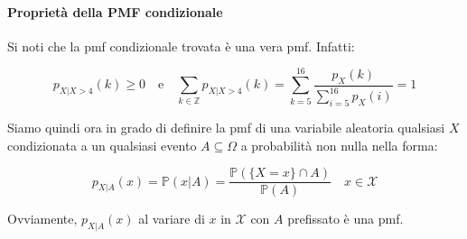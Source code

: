 \paragraph{Proprietà della PMF condizionale}
Si noti che la pmf condizionale trovata è una vera pmf. Infatti:

\[
p_{X|X>4}(k) \ge 0 \quad \text{e} \quad \sum_{k \in \mathbb{Z}} p_{X|X>4}(k) = \sum_{k=5}^{16} \frac{p_X(k)}{\sum_{i=5}^{16} p_X(i)} = 1
\]

Siamo quindi ora in grado di definire la pmf di una variabile aleatoria qualsiasi $X$ condizionata a un qualsiasi evento $A \subseteq \Omega$ a probabilità non nulla nella forma:

\begin{equation}
\boxed{p_{X|A}(x) = \mathbb{P}(x|A) = \frac{\mathbb{P}(\{X = x\} \cap A)}{\mathbb{P}(A)} \quad x \in \mathcal{X}}
\end{equation}

Ovviamente, $p_{X|A}(x)$ al variare di $x$ in $\mathcal{X}$ con $A$ prefissato è una pmf.


